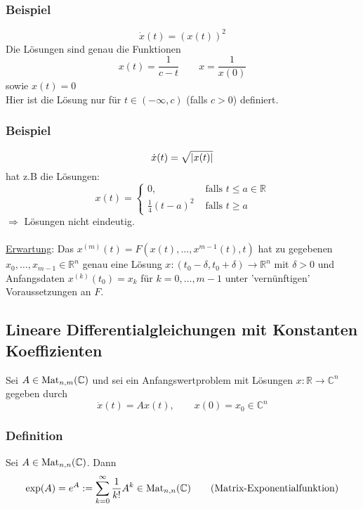 \subsubsection{Beispiel} %
\label{ssub:beispiel}
\[
	\dot x(t)= (x(t))^2
\]
Die Lösungen sind genau die Funktionen
\[
	x(t)= \frac{1}{c-t} \qquad x= \frac{1}{x(0)}  
\] sowie $x(t)=0$ \\
Hier ist die Lösung nur für $t \in (-\infty,c)$ (falls $c>0$) definiert.
\subsubsection{Beispiel} %
\label{ssub:beispiel}
\[
	\dot x(t)= \sqrt{\lvert x(t)\rvert}
\]
hat z.B die Lösungen:
\[
	x(t)= \begin{cases}
		0, &\text{ falls }t \leq a \in \mathbb{R}\\
		\frac{1}{4}(t-a)^2 &\text{ falls }t \geq a
	\end{cases}
\]
$\Rightarrow$ Lösungen nicht eindeutig. \\
\\
\underline{Erwartung}: Das  $x^{(m)}(t)= F(x(t), \dots , x^{m-1}(t),t)$ hat zu gegebenen $x_0,\dots, x_{m-1} \in \mathbb{R}^n$ genau eine Lösung $x:(t_0 - \delta , t_0 + \delta ) \to \mathbb{R}^n$ mit $\delta >0$ und Anfangsdaten $x^{(k)}(t_0)=x_k$ für $k = 0, \dots, m-1$ unter 'vernünftigen' Voraussetzungen an $F$.
\subsection{Lineare Differentialgleichungen mit Konstanten Koeffizienten} %
\label{sub:lineare_differentialgleichungen_mit_konstanten_koeffizienten}
Sei $A \in \operatorname{Mat}_{n,m}(\mathbb{C})$ und sei ein Anfangswertproblem mit Lösungen $x: \mathbb{R} \to \mathbb{C}^n$ gegeben durch
\[
	\dot x(t)= A x(t), \qquad x(0)=x_0 \in \mathbb{C}^n
\]
\subsubsection{Definition} %
\label{ssub:definition}
Sei $A \in \operatorname{Mat}_{n,n}(\mathbb{C})$. Dann 
\[
	\exp(A)= e^{A}:= \sum_{k=0}^{\infty} \frac{1}{k!}A^k \in \operatorname{Mat}_{n,n}(\mathbb{C}) \qquad \text{(Matrix-Exponentialfunktion)}
\] 
